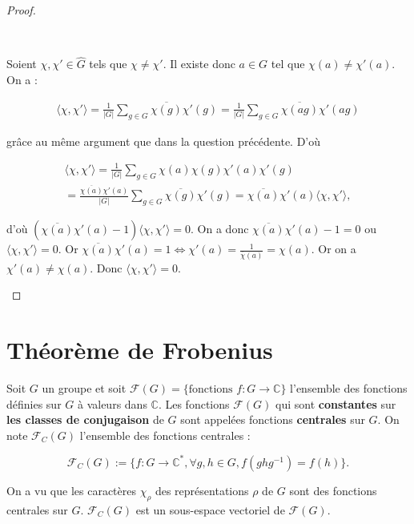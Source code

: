 \documentclass[french]{book}
\theoremstyle{definition}
\theoremstyle{remark}
\begin{document}
\begin{proof}
\begin{enumerate}
    \

    Soient \(\chi, \chi' \in \hat{G}\) tels que \(\chi \neq \chi'\). Il existe donc \(a \in G\) tel que \(\chi(a) \neq \chi'(a)\). On a :

    \begin{gather*}
      \langle \chi, \chi' \rangle  = \frac{1}{\lvert G \rvert} \sum_{g \in G}^{} \overline{\chi(g)} \chi'(g) = \frac{1}{\lvert G \rvert} \sum_{g \in G} \overline{\chi(ag)} \chi'(ag)
    \end{gather*}

    grâce au même argument que dans la question précédente. D'où

    \begin{gather*}
      \langle \chi, \chi' \rangle = \frac{1}{\lvert G \rvert} \sum_{g \in G} \chi(a)\chi(g) \chi'(a)\chi'(g) \\
       = \frac{\overline{\chi(a)} \chi'(a)}{\lvert G \rvert} \sum_{g \in G}^{} \overline{\chi(g)} \chi'(g)  = \overline{\chi(a)} \chi'(a) \langle \chi, \chi' \rangle,
    \end{gather*}

    d'où \((\overline{\chi(a)} \chi'(a) - 1) \langle \chi, \chi' \rangle = 0\). On a donc \(\overline{\chi(a)} \chi'(a) - 1 = 0\) ou \(\langle \chi, \chi' \rangle = 0\). Or \(\overline{\chi(a)}\chi'(a) = 1 \iff \chi'(a) = \frac{1}{\overline{\chi}(a)} = \chi(a)\). Or on a \(\chi'(a) \neq \chi(a)\). Donc \(\langle \chi, \chi' \rangle = 0\).
  \end{enumerate}
\end{proof}

\section{Théorème de Frobenius}

Soit \(G\) un groupe et soit \(\mathscr{F}(G) = \{ \text{fonctions } f : G \longrightarrow \mathbb{C} \} \) l'ensemble des fonctions définies sur \(G\) à valeurs dans \(\mathbb{C}\). Les fonctions \(\mathscr{F}(G)\) qui sont \textbf{constantes} sur  \textbf{les classes de conjugaison} de \(G\) sont appelées fonctions \textbf{centrales} sur \(G\). On note \(\mathscr{F}_C(G)\) l'ensemble des fonctions centrales :

\[\mathscr{F}_C(G) := \{ f : G \longrightarrow \mathbb{C} ^{*}, \forall g, h \in G, f (ghg ^{-1}) = f(h)\}.\]

On a vu que les caractères \(\chi _{\rho}\) des représentations \(\rho\) de \(G\) sont des fonctions centrales sur \(G\). \(\mathscr{F}_C(G)\) est un sous-espace vectoriel de \(\mathscr{F}(G)\).
\end{document}
